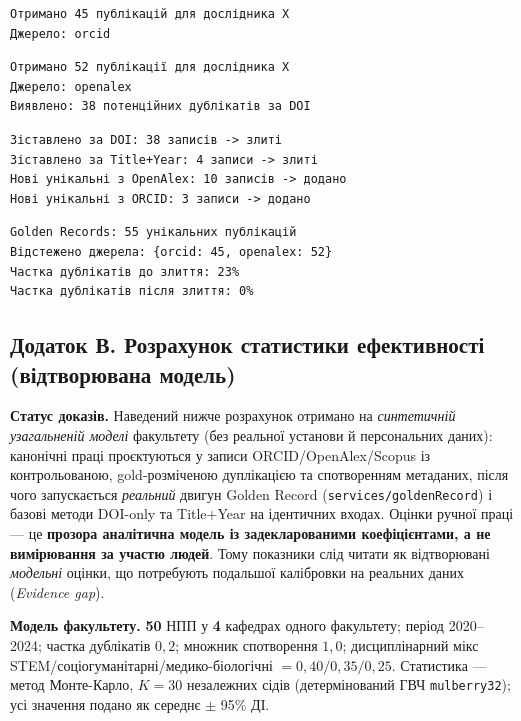 \begin{lstlisting}[caption={Лог виконання: крок 1 (збір з ORCID)},label={lst:b-orcid-log}]
Отримано 45 публікацій для дослідника X
Джерело: orcid
\end{lstlisting}

\begin{lstlisting}[caption={Лог виконання: крок 2 (збір з OpenAlex)},label={lst:b-openalex-log}]
Отримано 52 публікації для дослідника X
Джерело: openalex
Виявлено: 38 потенційних дублікатів за DOI
\end{lstlisting}

\begin{lstlisting}[caption={Лог виконання: крок 3 (злиття)},label={lst:b-merge-log}]
Зіставлено за DOI: 38 записів -> злиті
Зіставлено за Title+Year: 4 записи -> злиті
Нові унікальні з OpenAlex: 10 записів -> додано
Нові унікальні з ORCID: 3 записи -> додано
\end{lstlisting}

\begin{lstlisting}[caption={Лог виконання: результат формування Golden Record},label={lst:b-result-log}]
Golden Records: 55 унікальних публікацій
Відстежено джерела: {orcid: 45, openalex: 52}
Частка дублікатів до злиття: 23%
Частка дублікатів після злиття: 0%
\end{lstlisting}

\subsection*{Додаток В. Розрахунок статистики ефективності (відтворювана модель)}
\label{app:efficiency}

\textbf{Статус доказів.} Наведений нижче розрахунок отримано на \emph{синтетичній узагальненій моделі} факультету (без реальної установи й персональних даних): канонічні праці проєктуються у записи ORCID/OpenAlex/Scopus із контрольованою, gold-розміченою дуплікацією та спотворенням метаданих, після чого запускається \emph{реальний} двигун Golden Record (\texttt{services/goldenRecord}) і базові методи DOI-only та Title+Year на ідентичних входах. Оцінки ручної праці --- це \textbf{прозора аналітична модель із задекларованими коефіцієнтами, а не вимірювання за участю людей}. Тому показники слід читати як відтворювані \emph{модельні} оцінки, що потребують подальшої калібровки на реальних даних (\textit{Evidence gap}).

\textbf{Модель факультету.} \textbf{50} НПП у \textbf{4} кафедрах одного факультету; період 2020--2024; частка дублікатів $0{,}2$; множник спотворення $1{,}0$; дисциплінарний мікс STEM/соціогуманітарні/медико-біологічні $= 0{,}40/0{,}35/0{,}25$. Статистика --- метод Монте-Карло, $K=30$ незалежних сідів (детермінований ГВЧ \texttt{mulberry32}); усі значення подано як середнє $\pm$ 95\% ДІ.

